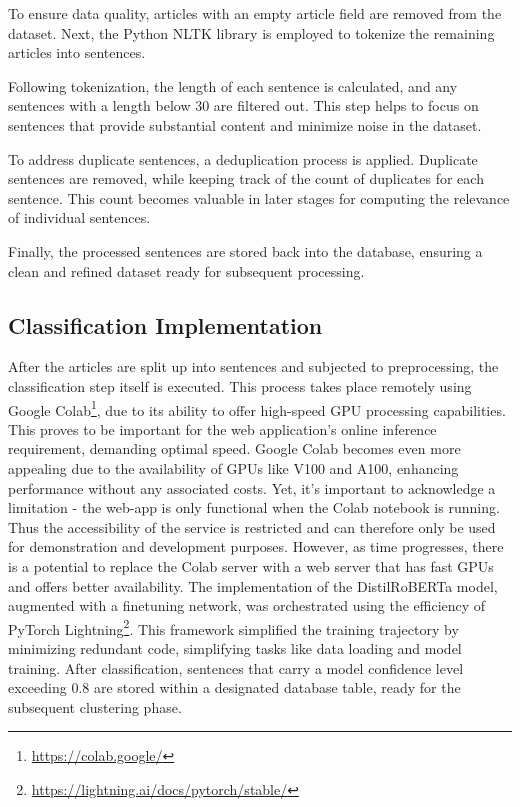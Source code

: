 \documentclass[a4paper,10pt]{report} %
\begin{document}
To ensure data quality, articles with an empty article field are removed from the dataset. Next, the Python NLTK library is employed to tokenize the remaining articles into sentences.

Following tokenization, the length of each sentence is calculated, and any sentences with a length below 30 are filtered out. This step helps to focus on sentences that provide substantial content and minimize noise in the dataset.

To address duplicate sentences, a deduplication process is applied. Duplicate sentences are removed, while keeping track of the count of duplicates for each sentence. This count becomes valuable in later stages for computing the relevance of individual sentences.

Finally, the processed sentences are stored back into the database, ensuring a clean and refined dataset ready for subsequent processing.

\subsection{Classification Implementation}
After the articles are split up into sentences and subjected to preprocessing, the classification step itself is executed. This process takes place remotely using Google Colab\footnote{\url{https://colab.google/}}, due to its ability to offer high-speed GPU processing capabilities. This proves to be important for the web application's online inference requirement, demanding optimal speed.
Google Colab becomes even more appealing due to the availability of GPUs like V100 and A100, enhancing performance without any associated costs. Yet, it's important to acknowledge a limitation - the web-app is only functional when the Colab notebook is running. Thus the accessibility of the service is restricted and can therefore only be used for demonstration and development purposes.
However, as time progresses, there is a potential to replace the Colab server with a web server that has fast GPUs and offers better availability.
The implementation of the DistilRoBERTa model, augmented with a finetuning network, was orchestrated using the efficiency of PyTorch Lightning\footnote{\url{https://lightning.ai/docs/pytorch/stable/}}. This framework simplified the training trajectory by minimizing redundant code, simplifying tasks like data loading and model training.
After classification, sentences that carry a model confidence level exceeding 0.8 are stored within a designated database table, ready for the subsequent clustering phase.
\end{document}
